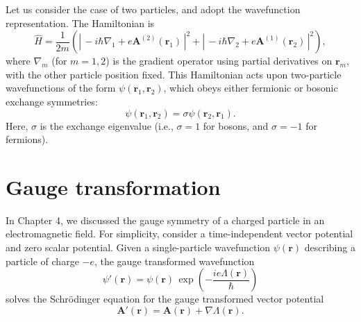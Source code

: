 \documentclass[pra,12pt]{revtex4}
\begin{document}
Let us consider the case of two particles, and adopt the wavefunction
representation.  The Hamiltonian is
\begin{equation}
  \hat{H} = \frac{1}{2m} \left( \left| \, -i\hbar \nabla_1
  + e\mathbf{A}^{(2)}(\mathbf{r}_1)\,\right|^2
  + \left| \, -i\hbar \nabla_2
  + e\mathbf{A}^{(1)}(\mathbf{r}_2)\,\right|^2\right),
  \label{HamA}
\end{equation}
where $\nabla_m$ (for $m = 1,2$) is the gradient operator using
partial derivatives on $\mathbf{r}_m$, with the other particle
position fixed.  This Hamiltonian acts upon two-particle wavefunctions
of the form $\psi(\mathbf{r}_1, \mathbf{r}_2)$, which obeys either
fermionic or bosonic exchange symmetries:
\begin{equation}
  \psi(\mathbf{r}_1, \mathbf{r}_2) = \sigma \psi(\mathbf{r}_2, \mathbf{r}_1).
  \label{exchange}
\end{equation}
Here, $\sigma$ is the exchange eigenvalue (i.e., $\sigma = 1$ for
bosons, and $\sigma = -1$ for fermions).

\section{Gauge transformation}

In Chapter 4, we discussed the gauge symmetry of a charged particle in
an electromagnetic field.  For simplicity, consider a time-independent
vector potential and zero scalar potential.  Given a single-particle
wavefunction $\psi(\mathbf{r})$ describing a particle of charge $-e$,
the gauge transformed wavefunction
\begin{equation}
  \psi'(\mathbf{r}) = \psi(\mathbf{r}) \,
  \exp\!\left(-\frac{ie\Lambda(\mathbf{r})}{\hbar}\right)
\end{equation}
solves the Schr\"odinger equation for the gauge transformed vector
potential
\begin{equation*}
  \mathbf{A}'(\mathbf{r}) = \mathbf{A}(\mathbf{r}) + \nabla \Lambda(\mathbf{r}).
\end{equation*}
\end{document}
